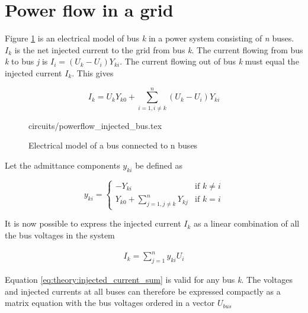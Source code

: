 \documentclass[class=book, crop=false]{standalone}
\begin{document}
\section{Power flow in a grid}
Figure \ref{fig:theory:powerflow_injected_bus} is an electrical model of bus \textit{k} in a power system consisting of \textit{n} buses. $I_{k}$ is the net injected current to the grid from bus \textit{k}\cite{opf_intro}. The current flowing from bus \textit{k} to bus \textit{j} is $I_{i} = (U_{k} - U_{i})Y_{ki}$. The current flowing out of bus \textit{k} must equal the injected current $I_{k}$. This gives

\begin{equation}\label{eq:powerflow_currentsum}
I_{k} =  U_{k}Y_{k0}
+ \sum_{i=1,i\neq k}^{n}(U_{k} - U_{i})Y_{ki}
\end{equation}



\begin{figure}[ht!]
    \center
    {circuits/powerflow_injected_bus.tex}
    \caption[size = 9]{Electrical model of a bus connected to n buses}
    \label{fig:theory:powerflow_injected_bus}
\end{figure}

Let the admittance components $y_{ki}$ be defined as


\begin{equation}
\label{eq:theory:admittance_components}
    y_{ki} =
\left\{
	\begin{array}{ll}
		     -Y_{ki}  & 
	    \mbox{if }
	        k \neq i
	           \\
		Y_{k0} + \sum_{j=1,j\neq k}^{n} Y_{kj} & \mbox{if } k=i
	\end{array}
\right.
\end{equation}


It is now possible to  express the injected current $I_{k}$ as a linear combination of all the bus voltages in the system 

\begin{equation}
    \begin{aligned}\label{eq:theory:injected_current_sum}
    I_{k} = \sum_{j=1}^{n} y_{ki}U_{i}
    \end{aligned} 
\end{equation}

Equation \eqref{eq:theory:injected_current_sum} is valid for any bus \textit{k}. The voltages and injected currents at all buses can therefore be expressed compactly as a matrix equation with the bus voltages ordered in a vector $U_{bus}$
\end{document}
